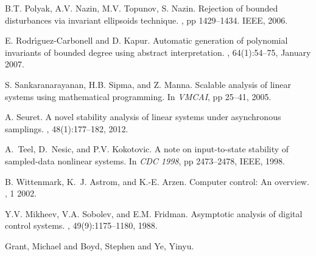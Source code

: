 \documentclass[letterpaper, 10 pt, conference]{ieeeconf}  %
\numberwithin{thm}{section}
\begin{document}
\begin{thebibliography}{10}
B.T. Polyak, A.V. Nazin, M.V. Topunov, S. Nazin.
\newblock Rejection of bounded disturbances via invariant ellipsoids technique.
, pp 1429--1434. IEEE, 2006.

E. Rodr\'{\i}guez-Carbonell and D. Kapur.
\newblock Automatic generation of polynomial invariants of bounded degree using
  abstract interpretation.
, 64(1):54--75, January 2007.

S. Sankaranarayanan, H.B. Sipma, and Z. Manna.
\newblock Scalable analysis of linear systems using mathematical programming.
\newblock In {\em VMCAI}, pp 25--41, 2005.

A. Seuret.
\newblock A novel stability analysis of linear systems under asynchronous
  samplings.
, 48(1):177--182, 2012.

A.~Teel, D.~Nesic, and P.V. Kokotovic.
\newblock A note on input-to-state stability of sampled-data nonlinear systems.
\newblock In {\em CDC 1998}, pp 2473--2478, IEEE, 1998.

B. Wittenmark, K.~J. Astrom, and K.-E. Arzen.
\newblock Computer control: An overview.
, 1 2002.

Y.V. Mikheev, V.A. Sobolev, and E.M. Fridman.
\newblock Asymptotic analysis of digital control systems.
, 49(9):1175--1180, 1988.

Grant, Michael and Boyd, Stephen and Ye, Yinyu.
  

\end{thebibliography}
\end{document}
